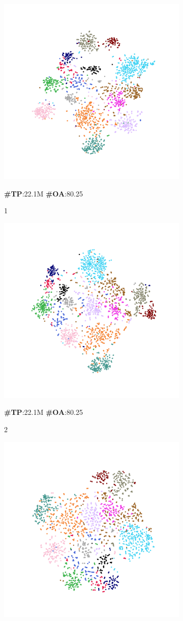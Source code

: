 \begin{figure}
    \centering
    \begin{subfigure}{0.24\textwidth}
        \centering
        \includegraphics[width=0.5\linewidth]{fig/tsne/point_mae1.pdf}
        \caption*{\textbf{\#TP}:22.1M \textbf{\#OA}:80.25}
        \caption{1}
        \label{fig:sub1}
    \end{subfigure}
    \hfill
    \begin{subfigure}{0.24\textwidth}
        \centering
        \includegraphics[width=0.5\linewidth]{fig/tsne/idpt1.pdf}
        \caption*{\textbf{\#TP}:22.1M \textbf{\#OA}:80.25}
        \caption{2}
        \label{fig:sub2}
    \end{subfigure}
    \hfill
    \begin{subfigure}{0.24\textwidth}
        \centering
        \includegraphics[width=0.5\linewidth]{fig/tsne/dapt1.pdf}

\end{subfigure}
\end{figure}
